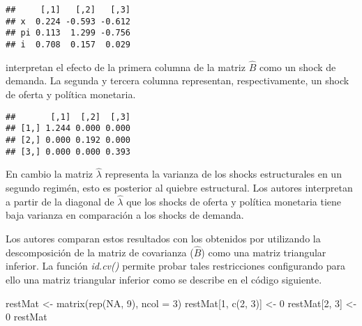 \documentclass[
]{book}
\newenvironment{Shaded}{\begin{snugshade}}{\end{snugshade}}
\newcommand{\AttributeTok}[1]{\textcolor[rgb]{0.77,0.63,0.00}{#1}}
\newcommand{\ConstantTok}[1]{\textcolor[rgb]{0.00,0.00,0.00}{#1}}
\newcommand{\DecValTok}[1]{\textcolor[rgb]{0.00,0.00,0.81}{#1}}
\newcommand{\FunctionTok}[1]{\textcolor[rgb]{0.00,0.00,0.00}{#1}}
\newcommand{\NormalTok}[1]{#1}
\newcommand{\OtherTok}[1]{\textcolor[rgb]{0.56,0.35,0.01}{#1}}
\newcommand{\SpecialCharTok}[1]{\textcolor[rgb]{0.00,0.00,0.00}{#1}}
\begin{document}
\begin{verbatim}
##     [,1]   [,2]   [,3]
## x  0.224 -0.593 -0.612
## pi 0.113  1.299 -0.756
## i  0.708  0.157  0.029
\end{verbatim}

\citet{Herwartz2016} interpretan el efecto de la primera columna de la matriz \(\hat{B}\) como un shock de demanda. La segunda y tercera columna representan, respectivamente, un shock de oferta y política monetaria.

\begin{Shaded}
\end{Shaded}

\begin{verbatim}
##       [,1]  [,2]  [,3]
## [1,] 1.244 0.000 0.000
## [2,] 0.000 0.192 0.000
## [3,] 0.000 0.000 0.393
\end{verbatim}

En cambio la matriz \(\hat{\lambda}\) representa la varianza de los shocks estructurales en un segundo regimén, esto es posterior al quiebre estructural. Los autores interpretan a partir de la diagonal de \(\hat{\lambda}\) que los shocks de oferta y política monetaria tiene baja varianza en comparación a los shocks de demanda.

Los autores comparan estos resultados con los obtenidos por \citet{Sims80} utilizando la descomposición de la matriz de covarianza (\(\hat{B}\)) como una matriz triangular inferior. La función \emph{id.cv()} permite
probar tales restricciones configurando para ello una matriz triangular inferior como se describe en el código siguiente.

\begin{Shaded}
\begin{Highlighting}[]
\NormalTok{restMat }\OtherTok{\textless{}{-}} \FunctionTok{matrix}\NormalTok{(}\FunctionTok{rep}\NormalTok{(}\ConstantTok{NA}\NormalTok{, }\DecValTok{9}\NormalTok{), }\AttributeTok{ncol =} \DecValTok{3}\NormalTok{)}
\NormalTok{restMat[}\DecValTok{1}\NormalTok{, }\FunctionTok{c}\NormalTok{(}\DecValTok{2}\NormalTok{, }\DecValTok{3}\NormalTok{)] }\OtherTok{\textless{}{-}} \DecValTok{0}
\NormalTok{restMat[}\DecValTok{2}\NormalTok{, }\DecValTok{3}\NormalTok{] }\OtherTok{\textless{}{-}} \DecValTok{0}
\NormalTok{restMat}
\end{Highlighting}
\end{Shaded}
\end{document}
